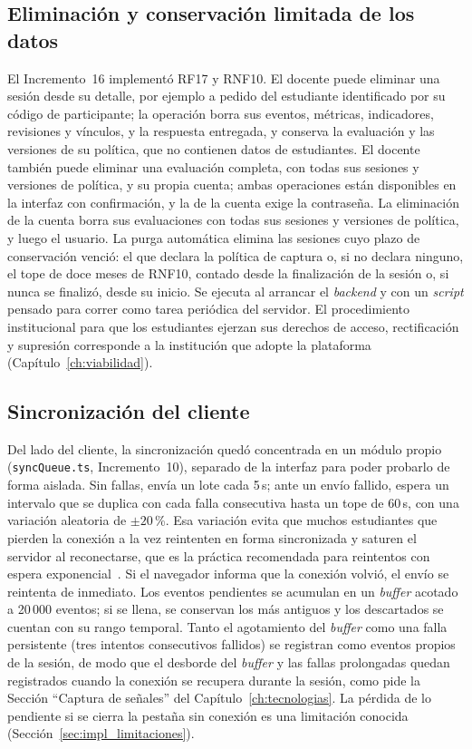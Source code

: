 \subsection{Eliminación y conservación limitada de los datos}
\label{sec:impl_retencion}

El Incremento~16 implementó RF17 y RNF10. El docente puede eliminar una sesión desde su detalle, por ejemplo a pedido del estudiante identificado por su código de participante; la operación borra sus eventos, métricas, indicadores, revisiones y vínculos, y la respuesta entregada, y conserva la evaluación y las versiones de su política, que no contienen datos de estudiantes. El docente también puede eliminar una evaluación completa, con todas sus sesiones y versiones de política, y su propia cuenta; ambas operaciones están disponibles en la interfaz con confirmación, y la de la cuenta exige la contraseña. La eliminación de la cuenta borra sus evaluaciones con todas sus sesiones y versiones de política, y luego el usuario. La purga automática elimina las sesiones cuyo plazo de conservación venció: el que declara la política de captura o, si no declara ninguno, el tope de doce meses de RNF10, contado desde la finalización de la sesión o, si nunca se finalizó, desde su inicio. Se ejecuta al arrancar el \textit{backend} y con un \textit{script} pensado para correr como tarea periódica del servidor. El procedimiento institucional para que los estudiantes ejerzan sus derechos de acceso, rectificación y supresión corresponde a la institución que adopte la plataforma (Capítulo~\ref{ch:viabilidad}).

\subsection{Sincronización del cliente}
\label{sec:impl_sincronizacion}

Del lado del cliente, la sincronización quedó concentrada en un módulo propio (\texttt{syncQueue.ts}, Incremento~10), separado de la interfaz para poder probarlo de forma aislada. Sin fallas, envía un lote cada 5\,s; ante un envío fallido, espera un intervalo que se duplica con cada falla consecutiva hasta un tope de 60\,s, con una variación aleatoria de $\pm 20$\,\%. Esa variación evita que muchos estudiantes que pierden la conexión a la vez reintenten en forma sincronizada y saturen el servidor al reconectarse, que es la práctica recomendada para reintentos con espera exponencial~\parencite{Brooker2026Backoff}. Si el navegador informa que la conexión volvió, el envío se reintenta de inmediato. Los eventos pendientes se acumulan en un \textit{buffer} acotado a 20\,000 eventos; si se llena, se conservan los más antiguos y los descartados se cuentan con su rango temporal. Tanto el agotamiento del \textit{buffer} como una falla persistente (tres intentos consecutivos fallidos) se registran como eventos propios de la sesión, de modo que el desborde del \textit{buffer} y las fallas prolongadas quedan registrados cuando la conexión se recupera durante la sesión, como pide la Sección ``Captura de señales'' del Capítulo~\ref{ch:tecnologias}. La pérdida de lo pendiente si se cierra la pestaña sin conexión es una limitación conocida (Sección~\ref{sec:impl_limitaciones}).

